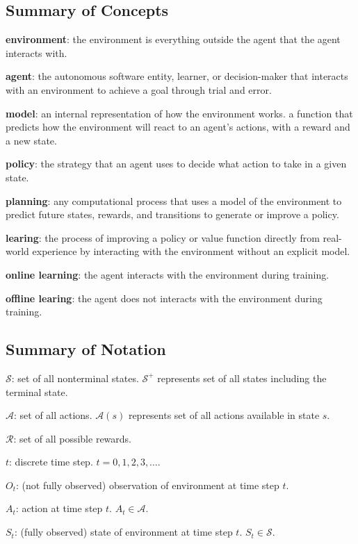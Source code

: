 \documentclass{article}
\begin{document}
\subsection{Summary of Concepts}

\textbf{environment}: the environment is everything outside the agent that the agent interacts with.

\textbf{agent}: the autonomous software entity, learner, or decision-maker that interacts with an environment to achieve a goal through trial and error.

\textbf{model}: an internal representation of how the environment works. a function that predicts how the environment will react to an agent's actions, with a reward and a new state.

\textbf{policy}: the strategy that an agent uses to decide what action to take in a given state.

\textbf{planning}: any computational process that uses a model of the environment to predict future states, rewards, and transitions to generate or improve a policy.

\textbf{learing}: the process of improving a policy or value function directly from real-world experience by interacting with the environment without an explicit model.

\textbf{online learning}: the agent interacts with the environment during training.

\textbf{offline learing}: the agent does not interacts with the environment during training.

\subsection{Summary of Notation}

\(\mathcal{S}\): set of all nonterminal states. \(\mathcal{S^+}\) represents set of all states including the terminal state.

\(\mathcal{A}\): set of all actions. \(\mathcal{A}(s)\) represents set of all actions available in state \(s\).

\(\mathcal{R}\): set of all possible rewards.

\(t\): discrete time step. \(t = 0, 1, 2, 3, \dots\).

\(O_t\): (not fully observed) observation of environment at time step \(t\).

\(A_t\): action at time step \(t\). \(A_t \in \mathcal{A}\).

\(S_t\): (fully observed) state of environment at time step \(t\). \(S_t \in \mathcal{S}\).
\end{document}
